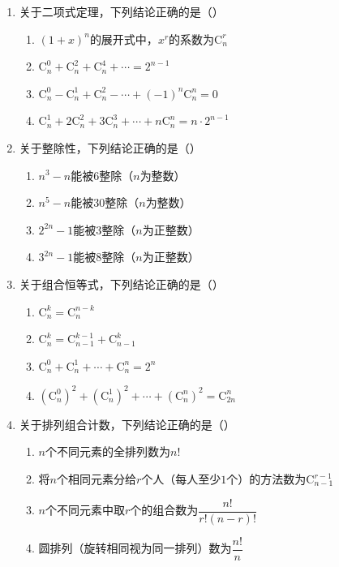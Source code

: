\documentclass[12pt, a4paper]{ctexart}
\begin{document}
\begin{enumerate}[label=\arabic*.]

\item 关于二项式定理，下列结论正确的是（\quad）
\begin{enumerate}[label=]
\item $(1+x)^n$的展开式中，$x^r$的系数为$\mathrm{C}_n^r$
\item $\mathrm{C}_n^0+\mathrm{C}_n^2+\mathrm{C}_n^4+\cdots=2^{n-1}$
\item $\mathrm{C}_n^0-\mathrm{C}_n^1+\mathrm{C}_n^2-\cdots+(-1)^n\mathrm{C}_n^n=0$
\item $\mathrm{C}_n^1+2\mathrm{C}_n^2+3\mathrm{C}_n^3+\cdots+n\mathrm{C}_n^n=n\cdot 2^{n-1}$
\end{enumerate}

\item 关于整除性，下列结论正确的是（\quad）
\begin{enumerate}[label=]
\item $n^3-n$能被$6$整除（$n$为整数）
\item $n^5-n$能被$30$整除（$n$为整数）
\item $2^{2n}-1$能被$3$整除（$n$为正整数）
\item $3^{2n}-1$能被$8$整除（$n$为正整数）
\end{enumerate}

\item 关于组合恒等式，下列结论正确的是（\quad）
\begin{enumerate}[label=]
\item $\mathrm{C}_n^k=\mathrm{C}_n^{n-k}$
\item $\mathrm{C}_n^k=\mathrm{C}_{n-1}^{k-1}+\mathrm{C}_{n-1}^k$
\item $\mathrm{C}_n^0+\mathrm{C}_n^1+\cdots+\mathrm{C}_n^n=2^n$
\item $(\mathrm{C}_n^0)^2+(\mathrm{C}_n^1)^2+\cdots+(\mathrm{C}_n^n)^2=\mathrm{C}_{2n}^n$
\end{enumerate}

\item 关于排列组合计数，下列结论正确的是（\quad）
\begin{enumerate}[label=]
\item $n$个不同元素的全排列数为$n!$
\item 将$n$个相同元素分给$r$个人（每人至少$1$个）的方法数为$\mathrm{C}_{n-1}^{r-1}$
\item $n$个不同元素中取$r$个的组合数为$\dfrac{n!}{r!(n-r)!}$
\item 圆排列（旋转相同视为同一排列）数为$\dfrac{n!}{n}$
\end{enumerate}

\end{enumerate}
\end{document}
